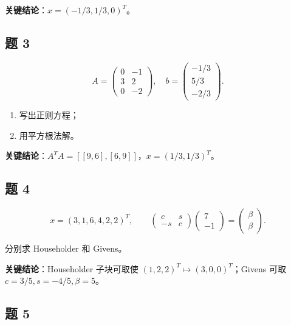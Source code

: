 \documentclass[11pt,a4paper]{ctexart}
\begin{document}
\textbf{关键结论}：$x=(-1/3,1/3,0)^T$。


\subsection*{题 3}


\[
A=\begin{pmatrix}0&-1\\3&2\\0&-2\end{pmatrix},\quad
b=\begin{pmatrix}-1/3\\5/3\\-2/3\end{pmatrix}.
\]

\begin{enumerate}

\item 写出正则方程；

\item 用平方根法解。

\end{enumerate}

\textbf{关键结论}：$A^TA=[[9,6],[6,9]]$，$x=(1/3,1/3)^T$。


\subsection*{题 4}


\[
x=(3,1,6,4,2,2)^T,\qquad
\begin{pmatrix}c&s\\-s&c\end{pmatrix}\begin{pmatrix}7\\-1\end{pmatrix}
=\begin{pmatrix}\beta\\\beta\end{pmatrix}.
\]

分别求 Householder 和 Givens。

\textbf{关键结论}：Householder 子块可取使 $(1,2,2)^T \mapsto (3,0,0)^T$；Givens 可取 $c=3/5, s=-4/5, \beta=5$。


\subsection*{题 5}
\end{document}
